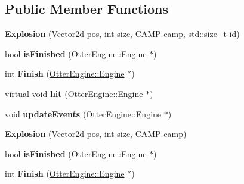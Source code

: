 \subsection*{Public Member Functions}
\begin{DoxyCompactItemize}
\item 
{\bfseries Explosion} (Vector2d pos, int size, C\+A\+MP camp, std\+::size\+\_\+t id)\hypertarget{class_explosion_ae909d28a6a9f73fc516a0b4a021ab436}{}\label{class_explosion_ae909d28a6a9f73fc516a0b4a021ab436}

\item 
bool {\bfseries is\+Finished} (\hyperlink{class_otter_engine_1_1_engine}{Otter\+Engine\+::\+Engine} $\ast$)\hypertarget{class_explosion_a8a3e5c28398cc58604932d0d2eec96f7}{}\label{class_explosion_a8a3e5c28398cc58604932d0d2eec96f7}

\item 
int {\bfseries Finish} (\hyperlink{class_otter_engine_1_1_engine}{Otter\+Engine\+::\+Engine} $\ast$)\hypertarget{class_explosion_a4661fe3a249eca547e9a805e34354cb6}{}\label{class_explosion_a4661fe3a249eca547e9a805e34354cb6}

\item 
virtual void {\bfseries hit} (\hyperlink{class_otter_engine_1_1_engine}{Otter\+Engine\+::\+Engine} $\ast$)\hypertarget{class_explosion_a059acac9abd8b778a1658b94102f5e56}{}\label{class_explosion_a059acac9abd8b778a1658b94102f5e56}

\item 
void {\bfseries update\+Events} (\hyperlink{class_otter_engine_1_1_engine}{Otter\+Engine\+::\+Engine} $\ast$)\hypertarget{class_explosion_a4f2f2c61984726ce7031d4d25c166fc6}{}\label{class_explosion_a4f2f2c61984726ce7031d4d25c166fc6}

\item 
{\bfseries Explosion} (Vector2d pos, int size, C\+A\+MP camp)\hypertarget{class_explosion_a648ee7281517f3b1c6c2a9f58a112c6c}{}\label{class_explosion_a648ee7281517f3b1c6c2a9f58a112c6c}

\item 
bool {\bfseries is\+Finished} (\hyperlink{class_otter_engine_1_1_engine}{Otter\+Engine\+::\+Engine} $\ast$)\hypertarget{class_explosion_a8a3e5c28398cc58604932d0d2eec96f7}{}\label{class_explosion_a8a3e5c28398cc58604932d0d2eec96f7}

\item 
int {\bfseries Finish} (\hyperlink{class_otter_engine_1_1_engine}{Otter\+Engine\+::\+Engine} $\ast$)\hypertarget{class_explosion_a4661fe3a249eca547e9a805e34354cb6}{}\label{class_explosion_a4661fe3a249eca547e9a805e34354cb6}


\end{DoxyCompactItemize}
